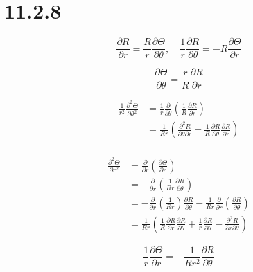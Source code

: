 \documentclass[12pt]{article}
\begin{document}
\newpage
\section{11.2.8}

\[
    \frac{\partial R}{\partial r} = \frac{R}{r}\frac{\partial \Theta}{\partial \theta}, \quad
    \frac{1}{r}\frac{\partial R}{\partial \theta} = - R\frac{\partial \Theta}{\partial r}
\]

\[
    \frac{\partial \Theta}{\partial \theta} = \frac{r}{R}\frac{\partial R}{\partial r}
\]

\begin{equation}
    \begin{split}
        \frac{1}{r^2}\frac{\partial^2 \Theta}{\partial \theta^2}
         & = \frac{1}{r} \frac{\partial }{\partial \theta}(\frac{1}{R}\frac{\partial R}{\partial r})                                                    \\
         & = \frac{1}{Rr}(\frac{\partial^2 R}{\partial \theta \partial r} - \frac{1}{R}\frac{\partial R}{\partial \theta}\frac{\partial R}{\partial r}) \\
    \end{split}
\end{equation}

\begin{equation}
    \begin{split}
        \frac{\partial^2 \Theta}{\partial r^2}
         & =\frac{\partial }{\partial r}(\frac{\partial \Theta}{\partial r})                                                                                              \\
         & = -\frac{\partial }{\partial r}(\frac{1}{Rr}\frac{\partial R}{\partial \theta})                                                                                \\
         & = -\frac{\partial }{\partial r}(\frac{1}{Rr})\frac{\partial R}{\partial \theta} - \frac{1}{Rr}\frac{\partial }{\partial r}(\frac{\partial R}{\partial \theta}) \\
         & = \frac{1}{Rr}(\frac{1}{R}\frac{\partial R}{\partial r} \frac{\partial R}{\partial \theta}
        + \frac{1}{r}\frac{\partial R}{\partial \theta}
        - \frac{\partial^2 R}{\partial r \partial \theta})
    \end{split}
\end{equation}

\[
    \frac{1}{r}\frac{\partial \Theta}{\partial r} = -\frac{1}{Rr^2}\frac{\partial R}{\partial \theta}
    \tag{3}
\]
\end{document}
